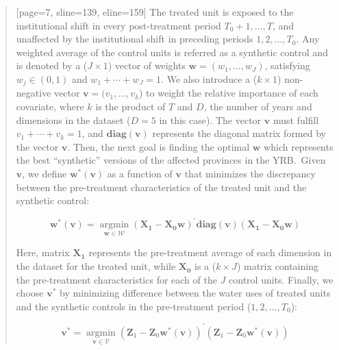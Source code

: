 \begin{quote}[page=7, sline=139, eline=159]
    The treated unit is exposed to the institutional shift in every post-treatment period $T_0 +1, \dots, T$, and unaffected by the institutional shift in preceding periods $1, 2, \dots, T_0$.
    Any weighted average of the control units is referred as a synthetic control and is denoted by a ($J \times 1$) vector of weights $\mathbf{w} = (w_{1}, \ldots ,w_{J})$, satisfying $w_j \in (0, 1)$ and $w_1 + \cdots  + w_{J} = 1$.
    We also introduce a ($k \times 1$) non-negative vector $\mathbf{v} = (v_{1}, \ldots ,v_{k}$) to weight the relative importance of each covariate, where $k$ is the product of $T$ and $D$, the number of years and dimensions in the dataset ($D = 5$ in this case).
    The vector $\mathbf{v}$ must fulfill $v_1 + \cdots  + v_{k} = 1$, and $\mathbf{diag(v)}$ represents the diagonal matrix formed by the vector $\mathbf{v}$.
    Then, the next goal is finding the optimal $\mathbf{w}$ which represents the best ``synthetic'' versions of the affected provinces in the YRB.\
    Given $\mathbf{v}$, we define $\mathbf{w^{*}(v)}$ as a function of $\mathbf{v}$ that minimizes the discrepancy between the pre-treatment characteristics of the treated unit and the synthetic control:

    \begin{equation}\label{eq1}
        \mathbf{w^{*}(v)}=\underset{\mathbf{w} \in \mathcal{W}}{\operatorname{argmin}}\left(\mathbf{X}_{\mathbf{1}}-\mathbf{X}_{\mathbf{0}} \mathbf{w}\right)^{\prime} \mathbf{diag(v)}\left(\mathbf{X}_{\mathbf{1}}-\mathbf{X}_{\mathbf{0}} \mathbf{w}\right)
    \end{equation}

    Here, matrix $\mathbf{X_1}$ represents the pre-treatment average of each dimension in the dataset for the treated unit, while $\mathbf{X_0}$ is a ($k \times J$) matrix containing the pre-treatment characteristics for each of the $J$ control units.
    Finally, we choose $\mathbf{v^{*}}$ by minimizing difference between the water uses of treated units and the synthetic controls in the pre-treatment period ($1, 2, \dots, T_0$):

    \begin{equation}\label{eq2}
        \mathbf{v}^{*}=\underset{\mathbf{v} \in \mathcal{V}}{\operatorname{argmin}}\left(\mathbf{Z}_{1}-\mathbf{Z}_{0} \mathbf{w}^{*}(\mathbf{v})\right)^{\prime}\left(\mathbf{Z}_{1}-\mathbf{Z}_{0} \mathbf{w}^{*}(\mathbf{v})\right)
    \end{equation}


\end{quote}
